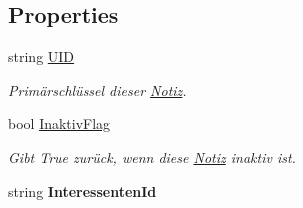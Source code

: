 \subsection*{Properties}
\begin{DoxyCompactItemize}
\item 
string \hyperlink{class_products_1_1_model_1_1_entities_1_1_notiz_a41e2e6af043d8ecdb6b64c02800630e5}{U\+ID}
\begin{DoxyCompactList}\small\item\em Primärschlüssel dieser \hyperlink{class_products_1_1_model_1_1_entities_1_1_notiz}{Notiz}. \end{DoxyCompactList}\item 
bool \hyperlink{class_products_1_1_model_1_1_entities_1_1_notiz_a0923c0995a3c7103a53dd06734c2fad2}{Inaktiv\+Flag}
\begin{DoxyCompactList}\small\item\em Gibt True zurück, wenn diese \hyperlink{class_products_1_1_model_1_1_entities_1_1_notiz}{Notiz} inaktiv ist. \end{DoxyCompactList}\item 
string {\bfseries Interessenten\+Id}\hypertarget{class_products_1_1_model_1_1_entities_1_1_notiz_aa8862188b0fe6d4b283bd1d476641710}{}\label{class_products_1_1_model_1_1_entities_1_1_notiz_aa8862188b0fe6d4b283bd1d476641710}


\end{DoxyCompactItemize}
